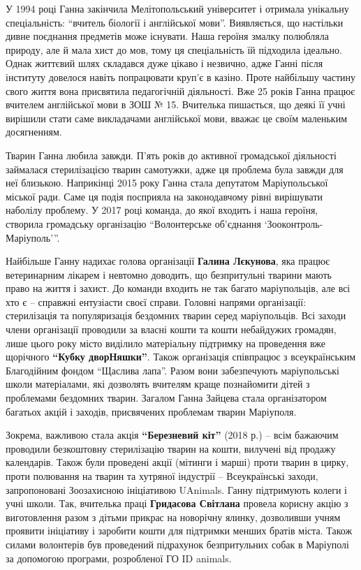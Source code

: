У 1994 році Ганна закінчила Мелітопольський університет і отримала унікальну
спеціальність: \enquote{вчитель біології і англійської мови}. Виявляється, що настільки
дивне поєднання предметів може існувати. Наша героїня змалку полюбляла природу,
але й мала хист до мов, тому ця спеціальність їй підходила ідеально. Однак
життєвий шлях складався дуже цікаво і незвично, адже Ганні після інституту
довелося навіть попрацювати круп'є в казіно. Проте найбільшу частину свого
життя вона присвятила педагогічній діяльності. Вже 25 років Ганна працює
вчителем англійської мови в ЗОШ № 15. Вчителька пишається, що деякі її учні
вирішили стати саме викладачами англійської мови, вважає це своїм маленьким
досягненням.


Тварин Ганна любила завжди. П'ять років до активної громадської діяльності
займалася стерилізацією тварин самотужки, адже ця проблема була завжди для неї
близькою. Наприкінці 2015 року Ганна стала депутатом Маріупольської міської
ради. Саме ця подія посприяла на законодавчому рівні вирішувати наболілу
проблему. У 2017 році команда, до якої входить і наша героїня, створила
громадську організацію \enquote{Волонтерське об'єднання
\enquote{Зооконтроль-Маріуполь}}.


Найбільше Ганну надихає голова організації \textbf{Галина Лєкунова}, яка працює
ветеринарним лікарем і невтомно доводить, що безпритульні тварини мають право
на життя і захист. До команди входить не так багато маріупольців, але всі хто є
– справжні ентузіасти своєї справи. Головні напрями організації: стерилізація
та популяризація бездомних тварин серед маріупольців. Всі заходи члени
організації проводили за власні кошти та кошти небайдужих громадян, лише цього
року місто виділило матеріальну підтримку на проведення вже щорічного \textbf{\enquote{Кубку
дворНяшки}}. Також організація співпрацює з всеукраїнським Благодійним фондом
\enquote{Щаслива лапа}. Разом вони забезпечують маріупольські школи матеріалами, які
дозволять вчителям краще познайомити дітей з проблемами бездомних тварин.
Загалом Ганна Зайцева стала організатором багатьох акцій і заходів, присвячених
проблемам тварин Маріуполя.


Зокрема, важливою стала акція \textbf{\enquote{Березневий кіт}} (2018 р.) – всім бажаючим
проводили безкоштовну стерилізацію тварин на кошти, вилучені від продажу
календарів. Також були проведені акції (мітинги і марші) проти тварин в цирку,
проти полювання на тварин та хутряної індустрії – Всеукраїнські заходи,
запропоновані Зоозахисною ініціативою UAnimals. Ганну підтримують колеги і учні
школи. Так, вчителька праці \textbf{Гридасова Світлана} провела корисну акцію з
виготовлення разом з дітьми прикрас на новорічну ялинку, дозволивши учням
проявити ініціативу і заробити кошти для підтримки менших братів міста. Також
силами волонтерів був проведений підрахунок безпритульних собак в Маріуполі за
допомогою програми, розробленої ГО ID animals.

